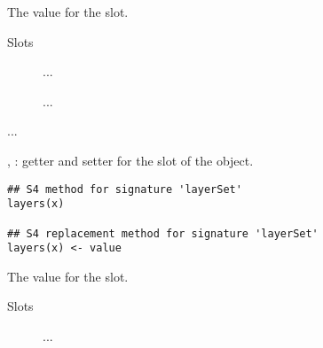 \documentclass[letterpaper]{book}
\begin{document}
%
\begin{Arguments}
\begin{ldescription}
\item[\code{value}] The value for the slot.
\end{ldescription}
\end{Arguments}
%
\begin{Section}{Slots}

\begin{description}

\item[] ...

\item[] ...

\end{description}
\end{Section}
%
\begin{Description}\relax
...

, : getter and setter
for the  slot of the object.
\end{Description}
%
\begin{Usage}
\begin{verbatim}
## S4 method for signature 'layerSet'
layers(x)

## S4 replacement method for signature 'layerSet'
layers(x) <- value
\end{verbatim}
\end{Usage}
%
\begin{Arguments}
\begin{ldescription}
\item[\code{value}] The value for the slot.
\end{ldescription}
\end{Arguments}
%
\begin{Section}{Slots}

\begin{description}

\item[] ...

\end{description}
\end{Section}
\end{document}
